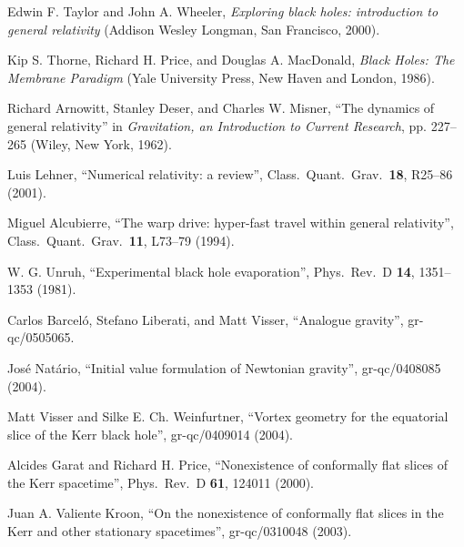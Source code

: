 \documentclass[twocolumn,showpacs,preprintnumbers,amsmath,amssymb,prb]{revtex4}
\begin{document}
\begin{thebibliography}{}

Edwin F. Taylor and John A. Wheeler,
{\sl Exploring black holes: introduction to general relativity}
(Addison Wesley Longman, San Francisco, 2000).

Kip S. Thorne, Richard H. Price, and Douglas A. MacDonald,
{\sl Black Holes: The Membrane Paradigm}
(Yale University Press, New Haven and London, 1986).

Richard Arnowitt, Stanley Deser, and Charles W. Misner,
``The dynamics of general relativity''
in {\sl Gravitation, an Introduction to Current Research},
pp. 227--265
(Wiley, New York, 1962).

Luis Lehner,
``Numerical relativity: a review'',
Class.\ Quant.\ Grav.\ \textbf{18}, R25--86 (2001).

Miguel Alcubierre,
``The warp drive: hyper-fast travel within general relativity'',
Class.\ Quant.\ Grav.\ \textbf{11}, L73--79 (1994).


W. G. Unruh,
``Experimental black hole evaporation'',
Phys.\ Rev.\ D \textbf{14}, 1351--1353 (1981).

Carlos Barcel\'o, Stefano Liberati, and Matt Visser,
``Analogue gravity'',
gr-qc/0505065.

Jos\'e Nat\'ario,
``Initial value formulation of Newtonian gravity'',
gr-qc/0408085
(2004).

Matt Visser and Silke E. Ch. Weinfurtner,
``Vortex geometry for the equatorial slice of the Kerr black hole'',
gr-qc/0409014
(2004).

Alcides Garat and Richard H. Price,
``Nonexistence of conformally flat slices of the Kerr spacetime'',
Phys.\ Rev.\ D \textbf{61}, 124011 (2000).

Juan A. Valiente Kroon,
``On the nonexistence of conformally flat slices
in the Kerr and other stationary spacetimes'',
gr-qc/0310048 (2003).


\end{thebibliography}
\end{document}
